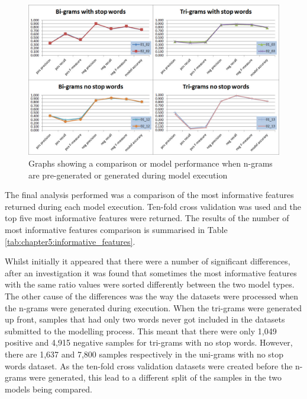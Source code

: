 \begin{figure}[htbp]
	\centering
	\includegraphics[width=1\textwidth]{Figures/Chapter5/nltk_process_chart_02.jpg}
	\caption[Comparison of pre-generated and in model n-gram generation]{Graphs showing a comparison or model performance when n-grams are pre-generated or generated during model execution}
	\label{fig:nltk_process_chart_02}
\end{figure}

The final analysis performed was a comparison of the most informative features returned during each model execution. Ten-fold cross validation was used and the top five most informative features were returned. The results of the number of most informative features comparison is summarised in Table \ref{tab:chapter5:informative_features}.

Whilst initially it appeared that there were a number of significant differences, after an investigation it was found that sometimes the most informative features with the same ratio values were sorted differently between the two model types. The other cause of the differences was the way the datasets were processed when the n-grams were generated during execution. When the tri-grams were generated up front, samples that had only two words never got included in the datasets submitted to the modelling process. This meant that there were only 1,049 positive and 4,915 negative samples for tri-grams with no stop words. However, there are 1,637 and 7,800 samples respectively in the uni-grams with no stop words dataset. As the ten-fold cross validation datasets were created before the n-grams were generated, this lead to a different split of the samples in the two models being compared. 

